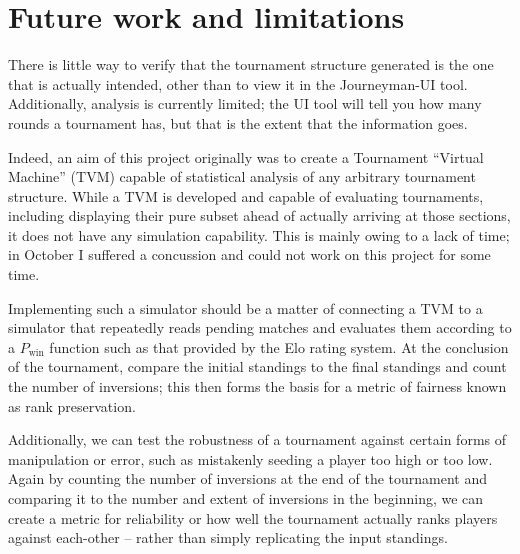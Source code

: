 \documentclass[a4,11pt,twoside,final,hidelinks]{article}
\begin{document}
\newpage

\section{Future work and limitations}
\label{sec:orgfa959e5}

There is little way to verify that the tournament structure generated is the one
that is actually intended, other than to view it in the Journeyman-UI tool.
Additionally, analysis is currently limited; the UI tool will tell you how many
rounds a tournament has, but that is the extent that the information goes.

Indeed, an aim of this project originally was to create a Tournament ``Virtual
Machine'' (TVM) capable of statistical analysis of any arbitrary tournament
structure. While a TVM is developed and capable of evaluating tournaments,
including displaying their pure subset ahead of actually arriving at those
sections, it does not have any simulation capability. This is mainly owing to a
lack of time; in October I suffered a concussion and could not work on this
project for some time.

Implementing such a simulator should be a matter of connecting a TVM to a
simulator that repeatedly reads pending matches and evaluates them according to
a \(P_\text{win}\) function such as that provided by the Elo rating system. At the
conclusion of the tournament, compare the initial standings to the final
standings and count the number of inversions; this then forms the basis for a
metric of fairness known as rank preservation.

Additionally, we can test the robustness of a tournament against certain forms
of manipulation or error, such as mistakenly seeding a player too high or too
low. Again by counting the number of inversions at the end of the tournament and
comparing it to the number and extent of inversions in the beginning, we can
create a metric for reliability or how well the tournament actually ranks
players against each-other -- rather than simply replicating the input
standings.

\newpage

\printbibliography
\end{document}
